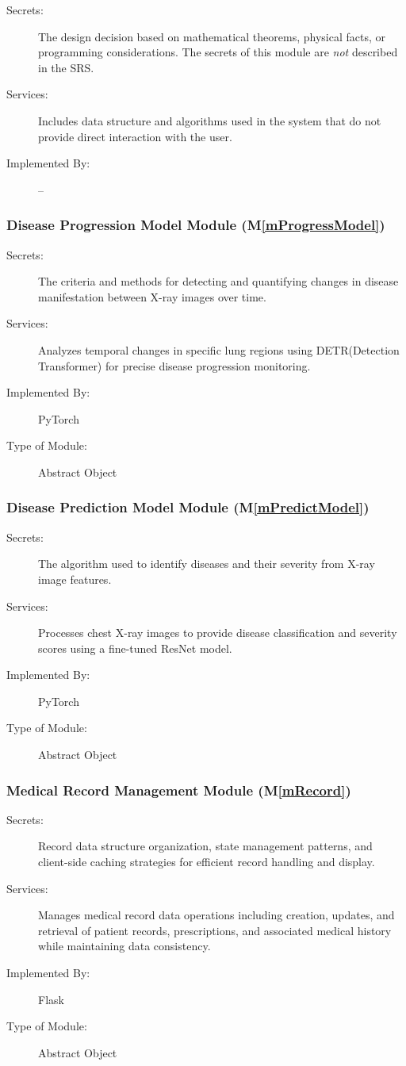 \documentclass[12pt, titlepage]{article}
\newcommand{\mref}[1]{M\ref{#1}}
\begin{document}
\begin{description}
\item[Secrets:] The design decision based on mathematical theorems, physical
  facts, or programming considerations. The secrets of this module are
  \emph{not} described in the SRS.
\item[Services:] Includes data structure and algorithms used in the system that
  do not provide direct interaction with the user. 
\item[Implemented By:] --
\end{description}

\subsubsection{Disease Progression Model Module (\mref{mProgressModel})}
\begin{description}
\item[Secrets:] The criteria and methods for detecting and quantifying changes in disease manifestation between X-ray images over time.
\item[Services:] Analyzes temporal changes in specific lung regions using DETR(Detection Transformer) for precise disease progression monitoring.
\item[Implemented By:] PyTorch
\item[Type of Module:] Abstract Object
\end{description}

\subsubsection{Disease Prediction Model Module (\mref{mPredictModel})}
\begin{description}
\item[Secrets:] The algorithm used to identify diseases and their severity from X-ray image features.
\item[Services:] Processes chest X-ray images to provide disease classification and severity scores using a fine-tuned ResNet model.
\item[Implemented By:] PyTorch
\item[Type of Module:] Abstract Object
\end{description}

\subsubsection{Medical Record Management Module (\mref{mRecord})}
\begin{description}
\item[Secrets:] Record data structure organization, state management patterns, and client-side caching strategies for efficient record handling and display.
\item[Services:] Manages medical record data operations including creation, updates, and retrieval of patient records, prescriptions, and associated medical history while maintaining data consistency.
\item[Implemented By:] Flask
\item[Type of Module:] Abstract Object
\end{description}
\end{document}
